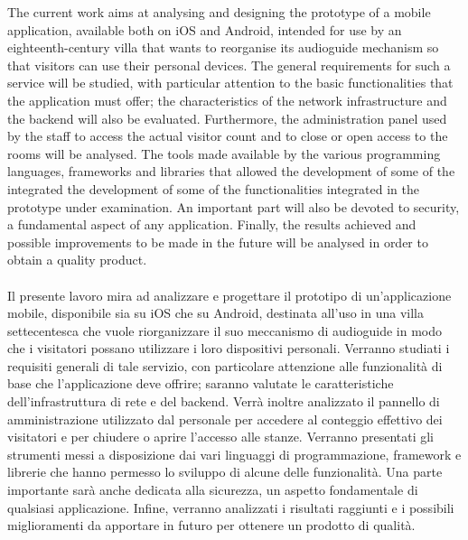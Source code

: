 The current work aims at analysing and designing the prototype of a mobile application, available both on iOS and Android, intended for use by an eighteenth-century villa that wants to reorganise its audioguide mechanism so that visitors can use their personal devices.
The general requirements for such a service will be studied, with particular attention to the basic functionalities that the application must offer; the characteristics of the network infrastructure and the backend will also be evaluated. Furthermore, the administration panel used by the staff to access the actual visitor count and to close or open access to the rooms will be analysed. The tools made available by the various programming languages, frameworks and libraries that allowed the development of some of the integrated
the development of some of the functionalities integrated in the prototype under examination. An important part will also be devoted to security, a fundamental aspect of any application. Finally, the results achieved and possible improvements to be made in the future will be analysed in order to obtain a quality product.\\\\
Il presente lavoro mira ad analizzare e progettare il prototipo di un'applicazione mobile, disponibile sia su iOS che su Android, destinata all'uso in una villa 
settecentesca che vuole riorganizzare il suo meccanismo di audioguide in modo che i visitatori possano utilizzare i loro dispositivi personali.
Verranno studiati i requisiti generali di tale servizio, con particolare attenzione alle funzionalità di base che l'applicazione deve offrire; saranno valutate le caratteristiche dell'infrastruttura di rete e del backend. Verrà inoltre analizzato il pannello di amministrazione utilizzato dal personale per accedere al conteggio effettivo %
dei visitatori e per chiudere o aprire l'accesso alle stanze. 
Verranno presentati gli strumenti messi a disposizione dai vari linguaggi di programmazione, framework e librerie che hanno permesso lo sviluppo di alcune delle funzionalità. Una parte importante sarà anche dedicata alla sicurezza, un aspetto fondamentale di qualsiasi applicazione. Infine, verranno analizzati i risultati raggiunti e i possibili miglioramenti da apportare in futuro per ottenere un prodotto di qualità.

